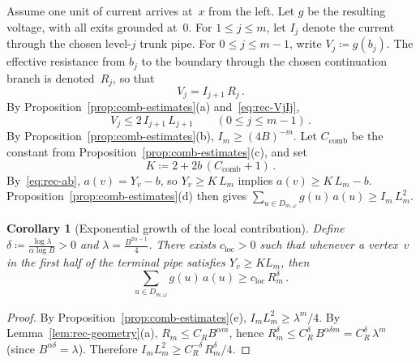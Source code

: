 \documentclass[11pt]{amsart}
\theoremstyle{plain}
\newtheorem{corollary}[theorem]{Corollary}
\theoremstyle{definition}
\begin{document}
	Assume one unit of current arrives at~$x$ from the left.  Let $g$ be the resulting voltage, with all exits grounded at~$0$.  For $1\leq j\leq m$, let $I_j$ denote the current through the chosen level-$j$ trunk pipe.  For $0\leq j\leq m{-}1$, write $V_j\coloneqq g(b_j)$.  The effective resistance from $b_j$ to the boundary through the chosen continuation branch is denoted~$R_j$, so that
	\begin{equation}\label{eq:rec-VjIj}
		V_j=I_{j+1}\,R_j\,.
	\end{equation}
	By Proposition~\ref{prop:comb-estimates}(a) and~\eqref{eq:rec-VjIj},
	\begin{equation}
		V_j\leq 2\,I_{j+1}\,L_{j+1}
		\qquad(0\leq j\leq m{-}1)\,.
	\end{equation}
	By Proposition~\ref{prop:comb-estimates}(b), $I_m\geq(4B)^{-m}$.  Let $C_{\mathrm{comb}}$ be the constant from Proposition~\ref{prop:comb-estimates}(c), and set
	\begin{equation}\label{eq:rec-K}
		K\coloneqq2+2b\,(C_{\mathrm{comb}}+1)\,.
	\end{equation}
	By~\eqref{eq:rec-ab}, $a(v)=Y_v-b$, so $Y_v\geq K\,L_m$ implies $a(v)\geq K\,L_m-b$. Proposition~\ref{prop:comb-estimates}(d) then gives $\sum_{u\in D_{m,\omega}}g(u)\,a(u)\geq I_m\,L_m^2$.
	
	\begin{corollary}[Exponential growth of the local contribution]\label{cor:rec-loc}
		Define $\delta\coloneqq\frac{\log\lambda}{\alpha\log B}>0$ and $\lambda=\frac{B^{2\alpha-1}}{4}$. There exists $c_{\mathrm{loc}}>0$ such that whenever a vertex~$v$ in the first half of the terminal pipe satisfies $Y_v\geq KL_m$, then
		\[
		\sum_{u\in D_{m,\omega}}
		g(u)\,a(u)
		\geq c_{\mathrm{loc}}\,R_m^{\delta}\,.
		\]
	\end{corollary}
	
	\begin{proof}
		By Proposition~\ref{prop:comb-estimates}(e), $I_m L_m^2\geq\lambda^m/4$.  By Lemma~\ref{lem:rec-geometry}(a), $R_m\leq C_R B^{\alpha m}$, hence $R_m^{\delta}\leq C_R^{\delta}\,B^{\alpha\delta m} =C_R^{\delta}\,\lambda^m$ (since $B^{\alpha\delta}=\lambda$).  Therefore $I_m L_m^2\geq C_R^{-\delta}\,R_m^{\delta}/4$.
	\end{proof}
	
\end{document}
